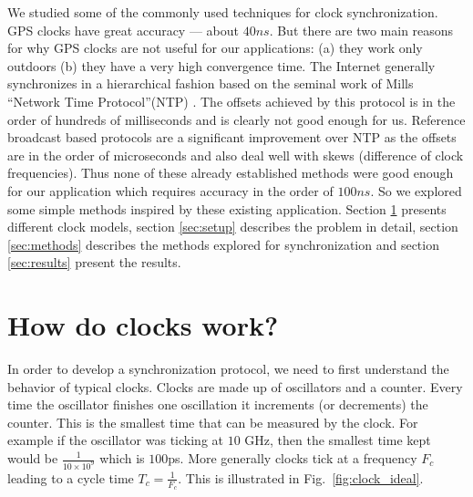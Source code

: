 \documentclass[10pt, journal, letter, onecolumn]{IEEEtran}
\begin{document}
We studied some of the commonly used techniques for clock synchronization.
GPS clocks have great accuracy --- about $40 ns$. But there are two main reasons for why GPS clocks are not useful for our applications: (a) they work only outdoors (b) they have a very high convergence time.
The Internet generally synchronizes in a hierarchical fashion based on the seminal work of Mills ``Network Time Protocol''(NTP) \cite{mills1991internet}.
The offsets achieved by this protocol is in the order of hundreds of milliseconds and is clearly not good enough for us.
Reference broadcast based protocols \cite{elson2004global, elson2002fine} are a significant improvement over NTP as the offsets are in the order of microseconds and also deal well with skews (difference of clock frequencies).
Thus none of these already established methods were good enough for our application which requires accuracy in the order of $100 ns$. So we explored some simple methods inspired by these existing application. Section \ref{sec:clock} presents different clock models, section \ref{sec:setup} describes the problem in detail, section \ref{sec:methods} describes the methods explored for synchronization and section \ref{sec:results} present the results.

\section{How do clocks work?}
\label{sec:clock}
In order to develop a synchronization protocol, we need to first understand the behavior of typical clocks. Clocks are made up of oscillators and a counter. Every time the oscillator finishes one oscillation it increments (or decrements) the counter. This is the smallest time that can be measured by the clock. For example if the oscillator was ticking at $10$ GHz, then the smallest time kept would be $\frac{1}{10 \times 10^{9}}$ which is $100$ps. More generally clocks tick at a frequency $F_c$ leading to a cycle time $T_c = \frac{1}{F_c}$. This is illustrated in Fig.~\ref{fig:clock_ideal}.
\end{document}
